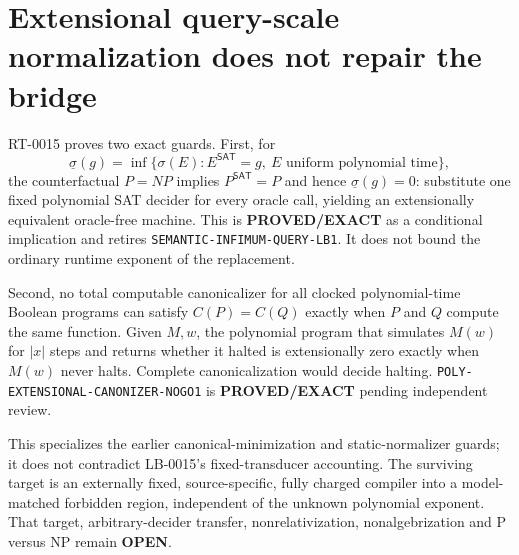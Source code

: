 \section{Extensional query-scale normalization does not repair the bridge}

RT-0015 proves two exact guards.  First, for
\[
 \underline\sigma(g)=\inf\{\sigma(E):E^{\mathsf{SAT}}=g,
 \ E\text{ uniform polynomial time}\},
\]
the counterfactual $P=NP$ implies $P^{\mathsf{SAT}}=P$ and hence
$\underline\sigma(g)=0$: substitute one fixed polynomial SAT decider for
every oracle call, yielding an extensionally equivalent oracle-free machine.
This is \textbf{PROVED/EXACT} as a conditional implication and retires
\texttt{SEMANTIC-INFIMUM-QUERY-LB1}.  It does not bound the ordinary runtime
exponent of the replacement.

Second, no total computable canonicalizer for all clocked polynomial-time
Boolean programs can satisfy $C(P)=C(Q)$ exactly when $P$ and $Q$ compute the
same function.  Given $M,w$, the polynomial program that simulates $M(w)$ for
$|x|$ steps and returns whether it halted is extensionally zero exactly when
$M(w)$ never halts.  Complete canonicalization would decide halting.
\texttt{POLY-EXTENSIONAL-CANONIZER-NOGO1} is \textbf{PROVED/EXACT} pending
independent review.

This specializes the earlier canonical-minimization and static-normalizer
guards; it does not contradict LB-0015's fixed-transducer accounting.  The
surviving target is an externally fixed, source-specific, fully charged
compiler into a model-matched forbidden region, independent of the unknown
polynomial exponent.  That target, arbitrary-decider transfer,
nonrelativization, nonalgebrization and P versus NP remain \textbf{OPEN}.

